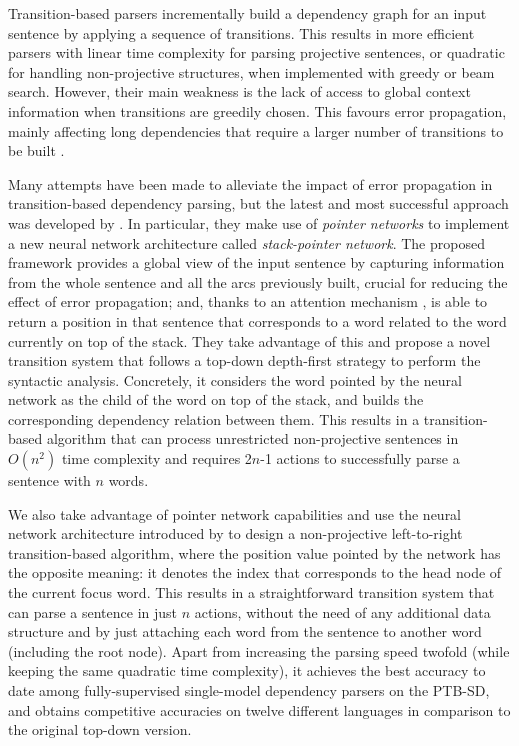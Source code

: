 \documentclass[11pt,a4paper]{article}
\begin{document}
Transition-based parsers incrementally build a dependency graph for an input sentence by 
applying a sequence of 
transitions. 
This results in more efficient parsers with linear time complexity for parsing projective sentences, or quadratic for handling non-projective structures, when implemented with greedy or beam search. However, their main weakness is 
the lack of access to global context information when transitions are greedily chosen. This 
favours error propagation, mainly affecting long dependencies that require a larger number of transitions to be built \cite{McDonald2011analyzing}. 

Many attempts have been made to alleviate the impact of error propagation in transition-based dependency parsing, but the latest and most successful approach was developed by \citet{Ma18}. In particular, they make use of \textit{pointer networks} \cite{Vinyals15} to implement a new neural network architecture called \textit{stack-pointer network}.
The proposed framework provides a global view of the input sentence by capturing information from the whole sentence and all the arcs previously built, crucial for reducing the effect of error propagation; and, thanks to an attention mechanism \cite{Bahdanau2014,Luong2015}, is able to return a position in that sentence that corresponds to a word related to the word currently on top of the stack. They take advantage of this and propose a novel transition system that 
follows a top-down depth-first strategy to perform the syntactic analysis. Concretely, it considers the word pointed by the neural network as the child of the word on top of the stack, 
and builds the corresponding dependency relation between them.
This results in a transition-based algorithm that can process unrestricted non-projective sentences in 
$O(n^2)$
time complexity and requires 2$n$-1 actions to successfully parse a sentence with $n$ words. 

We also take advantage of pointer network capabilities and use the neural network architecture introduced by \citet{Ma18} to design a non-projective left-to-right transition-based algorithm, where the position value pointed by the network has the opposite meaning: it denotes the index that corresponds to the head node of the current focus word.  
This results in a straightforward transition system that can parse a sentence in just $n$ actions, without the need of any additional data structure and by just attaching each word from the sentence to another word (including the root node). Apart from increasing the parsing speed twofold (while keeping the same quadratic time complexity), it achieves the best accuracy to date among fully-supervised single-model dependency parsers on the PTB-SD, and obtains competitive accuracies on twelve different languages in comparison to the original top-down version. 
\end{document}
